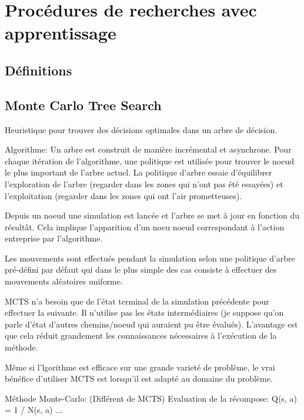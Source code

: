 
\section{Procédures de recherches avec apprentissage}

\subsection{Définitions}

\subsection{Monte Carlo Tree Search}
Heuristique pour trouver des décisions optimales dans un arbre de décision.

Algorithme:
Un arbre est construit de manière incrémental et asynchrone. Pour chaque itération de l'algorithme, une politique est utilisée pour trouver le noeud le plus important de l'arbre actuel.
La politique d'arbre essaie d'équilibrer l'exploration de l'arbre (regarder dans les zones qui n'ont pas été essayées) et l'exploitation (regarder dans les zones qui ont l'air prometteuses).

Depuis un noeud une simulation est lancée et l'arbre se met à jour en fonction du résultât. Cela implique l'apparition d'un noeu noeud correspondant à l'action entreprise par l'algorithme.

Les mouvements sont effectués pendant la simulation selon une politique d'arbre pré-défini par défaut qui dans le plus simple des cas consiste à effectuer des mouvements aléatoires uniforme.

MCTS n'a besoin que de l'état terminal de la simulation précédente pour effectuer la suivante. Il n'utilise pas les états intermédiaires (je suppose qu'on parle d'état d'autres chemins/noeud qui auraient pu être évalués).
L'avantage est que cela réduit grandement les connaissances nécessaires à l'exécution de la méthode.

Même si l'lgorithme est efficace sur une grande varieté de problème, le vrai bénéfice d'utiliser MCTS est lorsqu'il est adapté au domaine du problème.

Méthode Monte-Carlo:
(Différent de MCTS)
Evaluation de la récompose: Q(s, a) = 1 / N(s, a) ... %

